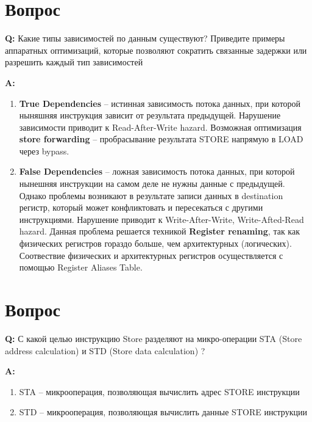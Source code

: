 \documentclass[12pt, letterpaper]{article}
\begin{document}
\newpage

\section{Вопрос}

\textbf{Q: } Какие типы зависимостей по данным существуют? Приведите примеры аппаратных оптимизаций, которые позволяют сократить связанные задержки или разрешить каждый тип зависимостей

\textbf{A: }

\begin{enumerate}
    \item \textbf{True Dependencies} -- истинная зависимость потока данных, при которой ныняшняя инструкция зависит от результата предыдущей. Нарушение зависимости приводит к Read-After-Write hazard.
    Возможная оптимизация \textbf{store forwarding} -- пробрасывание результата STORE напрямую в LOAD через bypass.
    \item \textbf{False Dependencies} -- ложная зависимость потока данных, при которой нынешняя инструкции на самом деле не нужны данные с предыдущей.
    Однако проблемы возникают в результате записи данных в destination регистр, который может конфликтовать и пересекаться с другими инструкциями. Нарушение приводит к Write-After-Write, Write-Afted-Read hazard.
    Данная проблема решается техникой \textbf{Register renaming}, так как физических регистров гораздо больше, чем архитектурных (логических).
    Соотвествие физических и архитектурных регистров осуществляется с помощью Register Aliases Table.


\end{enumerate}

\newpage

\section{Вопрос}

\textbf{Q: } С какой целью инструкцию Store разделяют на микро-операции STA
(Store address calculation) и STD (Store data calculation) ?

\textbf{A: }

\begin{enumerate}
    \item STA -- микрооперация, позволяющая вычислить адрес STORE инструкции
    \item STD -- микрооперация, позволяющая вычислить данные STORE инструкции
\end{enumerate}
\end{document}
